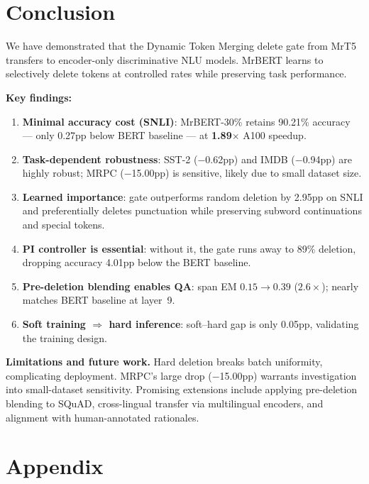 \documentclass{article} %
\begin{document}
\section{Conclusion}
\label{sec:conclusion}

We have demonstrated that the Dynamic Token Merging delete gate from MrT5 transfers to encoder-only discriminative NLU models. MrBERT learns to selectively delete tokens at controlled rates while preserving task performance. 

\noindent\textbf{Key findings:}

\begin{enumerate}[nosep]
    \item \textbf{Minimal accuracy cost (SNLI)}: MrBERT-30\% retains 90.21\% accuracy --- only 0.27pp below BERT baseline --- at \textbf{1.89$\times$} A100 speedup.
    \item \textbf{Task-dependent robustness}: SST-2 ($-$0.62pp) and IMDB ($-$0.94pp) are highly robust; MRPC ($-$15.00pp) is sensitive, likely due to small dataset size.
    \item \textbf{Learned importance}: gate outperforms random deletion by 2.95pp on SNLI and preferentially deletes punctuation while preserving subword continuations and special tokens.
    \item \textbf{PI controller is essential}: without it, the gate runs away to 89\% deletion, dropping accuracy 4.01pp below the BERT baseline.
    \item \textbf{Pre-deletion blending enables QA}: span EM $0.15\to0.39$ ($2.6\times$); nearly matches BERT baseline at layer~9.
    \item \textbf{Soft training $\Rightarrow$ hard inference}: soft--hard gap is only 0.05pp, validating the training design.
\end{enumerate}

\noindent \textbf{Limitations and future work.}
Hard deletion breaks batch uniformity, complicating deployment.  MRPC's large drop ($-$15.00pp) warrants investigation into small-dataset sensitivity.  Promising extensions include applying pre-deletion blending to SQuAD, cross-lingual transfer via multilingual encoders, and alignment with human-annotated rationales.




\newpage
\appendix

\section*{Appendix}
\end{document}
